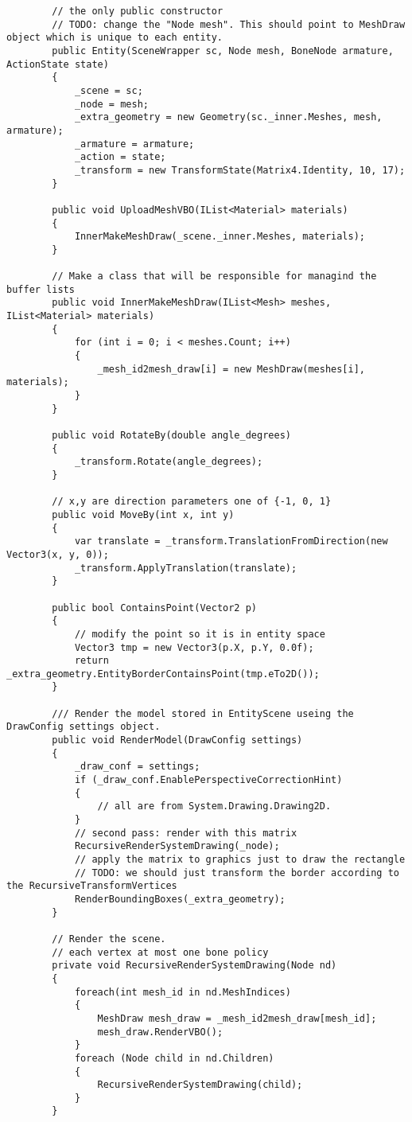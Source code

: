 \begin{scriptsize}
\begin{verbatim}
        // the only public constructor
        // TODO: change the "Node mesh". This should point to MeshDraw object which is unique to each entity.
        public Entity(SceneWrapper sc, Node mesh, BoneNode armature, ActionState state)
        {
            _scene = sc;
            _node = mesh;
            _extra_geometry = new Geometry(sc._inner.Meshes, mesh, armature);
            _armature = armature;
            _action = state;
            _transform = new TransformState(Matrix4.Identity, 10, 17);
        }

        public void UploadMeshVBO(IList<Material> materials)
        {
            InnerMakeMeshDraw(_scene._inner.Meshes, materials);
        }

        // Make a class that will be responsible for managind the buffer lists
        public void InnerMakeMeshDraw(IList<Mesh> meshes, IList<Material> materials)
        {
            for (int i = 0; i < meshes.Count; i++)
            {
                _mesh_id2mesh_draw[i] = new MeshDraw(meshes[i], materials);
            }
        }

        public void RotateBy(double angle_degrees)
        {
            _transform.Rotate(angle_degrees);
        }

        // x,y are direction parameters one of {-1, 0, 1}
        public void MoveBy(int x, int y)
        {
            var translate = _transform.TranslationFromDirection(new Vector3(x, y, 0));
            _transform.ApplyTranslation(translate);
        }

        public bool ContainsPoint(Vector2 p)
        {
            // modify the point so it is in entity space
            Vector3 tmp = new Vector3(p.X, p.Y, 0.0f);
            return _extra_geometry.EntityBorderContainsPoint(tmp.eTo2D());
        }

        /// Render the model stored in EntityScene useing the DrawConfig settings object.
        public void RenderModel(DrawConfig settings)
        {
            _draw_conf = settings;
            if (_draw_conf.EnablePerspectiveCorrectionHint)
            {
                // all are from System.Drawing.Drawing2D.
            }
            // second pass: render with this matrix
            RecursiveRenderSystemDrawing(_node);
            // apply the matrix to graphics just to draw the rectangle
            // TODO: we should just transform the border according to the RecursiveTransformVertices
            RenderBoundingBoxes(_extra_geometry);
        }

        // Render the scene.
        // each vertex at most one bone policy
        private void RecursiveRenderSystemDrawing(Node nd)
        {
            foreach(int mesh_id in nd.MeshIndices)
            {
                MeshDraw mesh_draw = _mesh_id2mesh_draw[mesh_id];
                mesh_draw.RenderVBO();
            }
            foreach (Node child in nd.Children)
            {
                RecursiveRenderSystemDrawing(child);
            }
        }


\end{verbatim}
\end{scriptsize}
